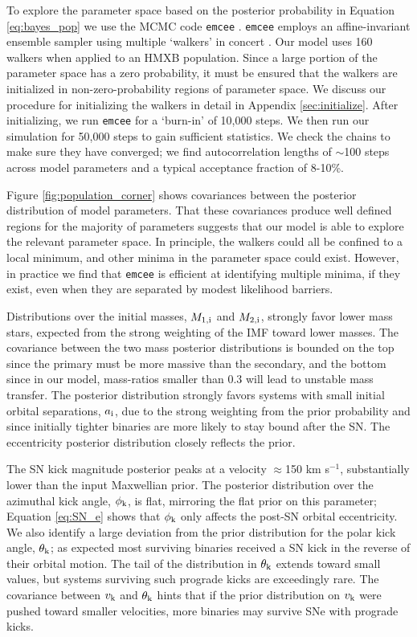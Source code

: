 \documentclass[usenatbib]{mnras}
\begin{document}
To explore the parameter space based on the posterior probability in Equation \ref{eq:bayes_pop} we use the MCMC code {\tt emcee} \citep{foreman-mackey13}. {\tt emcee} employs an affine-invariant ensemble sampler using multiple `walkers' in concert \citep{goodman10}. Our model uses 160 walkers when applied to an HMXB population. Since a large portion of the parameter space has a zero probability, it must be ensured that the walkers are initialized in non-zero-probability regions of parameter space. We discuss our procedure for initializing the walkers in detail in Appendix \ref{sec:initialize}. After initializing, we run {\tt emcee} for a `burn-in' of 10,000 steps. We then run our simulation for 50,000 steps to gain sufficient statistics. We check the chains to make sure they have converged; we find autocorrelation lengths of $\sim$100 steps across model parameters and a typical acceptance fraction of 8-10\%. 

Figure \ref{fig:population_corner} shows covariances between the posterior distribution of model parameters. That these covariances produce well defined regions for the majority of parameters suggests that our model is able to explore the relevant parameter space. In principle, the walkers could all be confined to a local minimum, and other minima in the parameter space could exist. However, in practice we find that {\tt emcee} is efficient at identifying multiple minima, if they exist, even when they are separated by modest likelihood barriers. 


Distributions over the initial masses, $M_{\rm 1,i}$ and $M_{\rm 2,i}$, strongly favor lower mass stars, expected from the strong weighting of the IMF toward lower masses. The covariance between the two mass posterior distributions is bounded on the top since the primary must be more massive than the secondary, and the bottom since in our model, mass-ratios smaller than 0.3 will lead to unstable mass transfer. The posterior distribution strongly favors systems with small initial orbital separations, $a_{\rm i}$, due to the strong weighting from the prior probability and since initially tighter binaries are more likely to stay bound after the SN. The eccentricity posterior distribution closely reflects the prior. 

The SN kick magnitude posterior peaks at a velocity $\approx$150 km s$^{-1}$, substantially lower than the input Maxwellian prior. The posterior distribution over the azimuthal kick angle, $\phi_{\rm k}$, is flat, mirroring the flat prior on this parameter; Equation \ref{eq:SN_e} shows that $\phi_{\rm k}$ only affects the post-SN orbital eccentricity. We also identify a large deviation from the prior distribution for the polar kick angle, $\theta_{\rm k}$; as expected most surviving binaries received a SN kick in the reverse of their orbital motion. The tail of the distribution in $\theta_{\rm k}$ extends toward small values, but systems surviving such prograde kicks are exceedingly rare. The covariance between $v_{\rm k}$ and $\theta_{\rm k}$ hints that if the prior distribution on $v_{\rm k}$ were pushed toward smaller velocities, more binaries may survive SNe with prograde kicks. 
\end{document}
